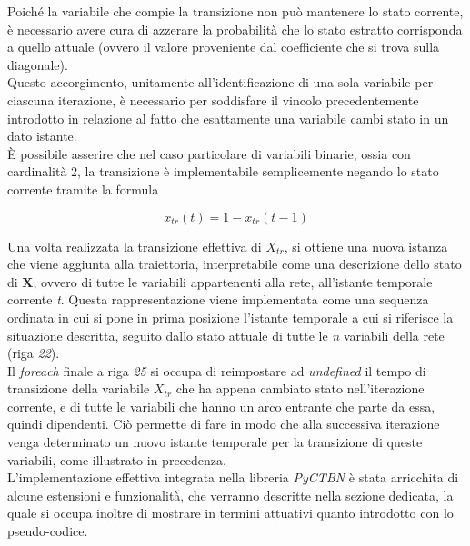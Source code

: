   Poiché la variabile che compie la transizione non può mantenere lo stato corrente, è necessario avere cura di 
  azzerare la probabilità che lo stato estratto corrisponda a quello attuale (ovvero il valore proveniente dal coefficiente che si trova sulla diagonale).\\
  Questo accorgimento, unitamente all'identificazione di una sola variabile per ciascuna iterazione, è necessario per soddisfare 
  il vincolo precedentemente introdotto in relazione al fatto che esattamente una variabile cambi stato in un dato istante.\\
  È possibile asserire che nel caso particolare di variabili binarie, ossia con cardinalità 2, la transizione è 
  implementabile semplicemente negando lo stato corrente tramite la formula

  \begin{equation}
    x_{tr}(t) = 1 - x_{tr}(t-1)  
  \end{equation}

  Una volta realizzata la transizione effettiva di $X_{tr}$, si ottiene una nuova istanza che viene aggiunta alla traiettoria,
  interpretabile come una descrizione dello stato di $\bm{X}$, ovvero di tutte le variabili appartenenti
  alla rete, all'istante temporale corrente \textit{t}. Questa rappresentazione
  viene implementata come una sequenza ordinata in cui si pone in prima posizione
  l'istante temporale a cui si riferisce la situazione descritta, seguito dallo
  stato attuale di tutte le \textit{n} variabili della rete (riga \textit{22}).\\
  Il \textit{foreach} finale a riga \textit{25} si occupa di reimpostare ad \textit{undefined} 
  il tempo di transizione della variabile $X_{tr}$ che ha appena cambiato stato nell'iterazione corrente,
  e di tutte le variabili che hanno un arco entrante che parte da essa, quindi dipendenti.
  Ciò permette di fare in modo che alla successiva iterazione venga determinato un nuovo
  istante temporale per la transizione di queste variabili, come illustrato in precedenza.\\
  L'implementazione effettiva integrata nella libreria \textit{PyCTBN}
  è stata arricchita di alcune estensioni e funzionalità, che verranno descritte
  nella sezione dedicata, la quale si occupa inoltre di mostrare in termini attuativi
  quanto introdotto con lo pseudo-codice.